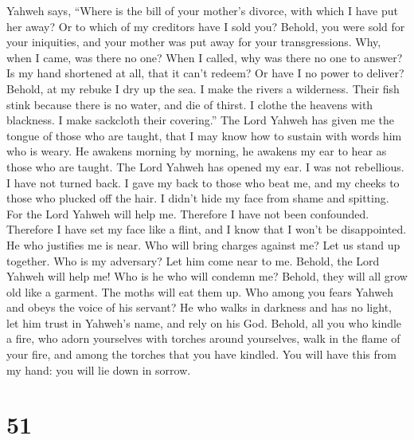  Yahweh says, ``Where is the bill of your mother's
divorce, with which I have put her away? Or to which of my creditors
have I sold you? Behold, you were sold for your iniquities, and your
mother was put away for your transgressions.  Why, when I
came, was there no one? When I called, why was there no one to answer?
Is my hand shortened at all, that it can't redeem? Or have I no power to
deliver? Behold, at my rebuke I dry up the sea. I make the rivers a
wilderness. Their fish stink because there is no water, and die of
thirst.  I clothe the heavens with blackness. I make
sackcloth their covering.''  The Lord Yahweh has given me
the tongue of those who are taught, that I may know how to sustain with
words him who is weary. He awakens morning by morning, he awakens my ear
to hear as those who are taught.  The Lord Yahweh has
opened my ear. I was not rebellious. I have not turned back.
 I gave my back to those who beat me, and my cheeks to
those who plucked off the hair. I didn't hide my face from shame and
spitting.  For the Lord Yahweh will help me. Therefore I
have not been confounded. Therefore I have set my face like a flint, and
I know that I won't be disappointed.  He who justifies me
is near. Who will bring charges against me? Let us stand up together.
Who is my adversary? Let him come near to me.  Behold, the
Lord Yahweh will help me! Who is he who will condemn me? Behold, they
will all grow old like a garment. The moths will eat them up.
 Who among you fears Yahweh and obeys the voice of his
servant? He who walks in darkness and has no light, let him trust in
Yahweh's name, and rely on his God.  Behold, all you who
kindle a fire, who adorn yourselves with torches around yourselves, walk
in the flame of your fire, and among the torches that you have kindled.
You will have this from my hand: you will lie down in sorrow.

\hypertarget{section-48}{%
\section{51}\label{section-48}}

